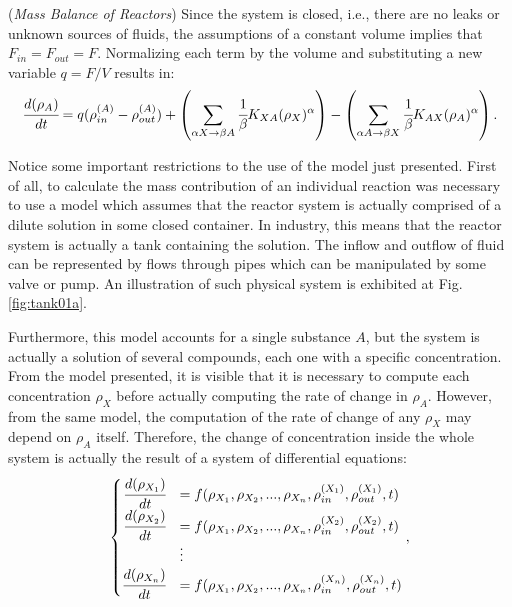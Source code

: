 \documentclass[a4paper,11pt]{book}
\numberwithin{figure}{chapter}
\numberwithin{equation}{chapter}
\numberwithin{table}{chapter}
\theoremstyle{definition}
\newtheorem{example}{Example}[chapter]
\newcounter{boxed-theorem}
\newcounter{boxed-definition}
\newcounter{boxed-example}
\newenvironment{boxed-example}[1]
{\colorlet{shadecolor}{pastelRed!20} \begin{shaded} \begin{example}{#1}}
{\end{example} \end{shaded}}
\begin{document}
\begin{boxed-example}{(\textit{Mass Balance of Reactors})}
    Since the system is closed, i.e., there are no leaks or unknown sources of fluids, the assumptions of a constant volume implies that $F_{in} = F_{out} = F$. Normalizing each term by the volume and substituting a new variable $q = F/V$ results in:
    \begin{equation} \label{eq:isoModel3}
            \cfrac{d (\rho_A)}{dt} = q (\rho^{(A)}_{in} - \rho^{(A)}_{out}) + \left( \sum_{\alpha X \rightarrow \beta A} \cfrac{1}{\beta} K_{XA} (\rho_X)^{\alpha} \right) - \left(\sum_{\alpha A \rightarrow \beta X} \cfrac{1}{\beta} K_{AX} (\rho_A)^{\alpha} \right)
    .\end{equation}
\end{boxed-example}

Notice some important restrictions to the use of the model just presented. First of all, to calculate the mass contribution of an individual reaction was necessary to use a model which assumes that the reactor system is actually comprised of a dilute solution in some closed container. In industry, this means that the reactor system is actually a tank containing the solution. The inflow and outflow of fluid can be represented by flows through pipes which can be manipulated by some valve or pump. An illustration of such physical system is exhibited at Fig. \ref{fig:tank01a}.

Furthermore, this model accounts for a single substance $A$, but the system is actually a solution of several compounds, each one with a specific concentration. From the model presented, it is visible that it is necessary to compute each concentration $\rho_X$ before actually computing the rate of change in $\rho_A$. However, from the same model, the computation of the rate of change of any $\rho_X$ may depend on $\rho_A$ itself. Therefore, the change of concentration inside the whole system is actually the result of a system of differential equations:
\begin{align}   \label{eq:isoSys01}
\begin{cases}
    \hfill \cfrac{d (\rho_{X_1})}{dt} &= f(\rho_{X_1}, \rho_{X_2}, ..., \rho_{X_n}, \rho_{in}^{(X_1)}, \rho_{out}^{(X_1)}, t) \\
    \hfill \cfrac{d (\rho_{X_2})}{dt} &= f(\rho_{X_1}, \rho_{X_2}, ..., \rho_{X_n}, \rho_{in}^{(X_2)}, \rho_{out}^{(X_2)}, t) \\
    & \vdots   \\
    \hfill \cfrac{d (\rho_{X_n})}{dt} &= f(\rho_{X_1}, \rho_{X_2}, ..., \rho_{X_n}, \rho_{in}^{(X_n)}, \rho_{out}^{(X_n)}, t)
\end{cases}
,\end{align}
\end{document}
